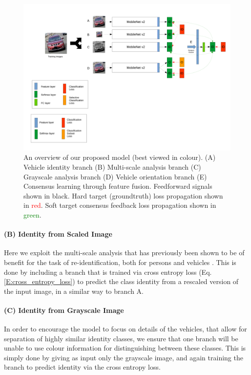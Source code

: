 \documentclass[10pt,twocolumn,letterpaper]{article}
\begin{document}
\begin{figure}
  \includegraphics[width=\linewidth,trim=0cm 8cm 0cm 0cm,clip=true]{images/system_overview_orient_only.pdf}
  \caption{An overview of our proposed model (best viewed in colour). (A) Vehicle identity branch (B) Multi-scale analysis branch (C) Grayscale analysis branch (D) Vehicle orientation branch
(E) Consensus learning through feature fusion. Feedforward signals shown in black. Hard target (groundtruth) loss propagation shown in \textcolor{red}{red}. Soft target consensus feedback loss propagation shown in \textcolor{green}{green}.}
  \label{F:overview}
\end{figure}

\paragraph{(B) Identity from Scaled Image}

Here we exploit the multi-scale analysis that has previously been shown to be of benefit for the task of re-identification, both for persons \cite{chen2017person} and vehicles \cite{kanaci2018vehicle}. This is done by including a branch that is trained via cross entropy loss (Eq. \ref{E:cross_entropy_loss}) to predict the class identity from a rescaled version of the input image, in a similar way to branch A.

\paragraph{(C) Identity from Grayscale Image}

In order to encourage the model to focus on details of the vehicles, that allow for separation of highly similar identity classes, we ensure that one branch will be unable to use colour information for distinguishing between these classes. This is simply done by giving as input only the grayscale image, and again training the branch to predict identity via the cross entropy loss.
\end{document}
